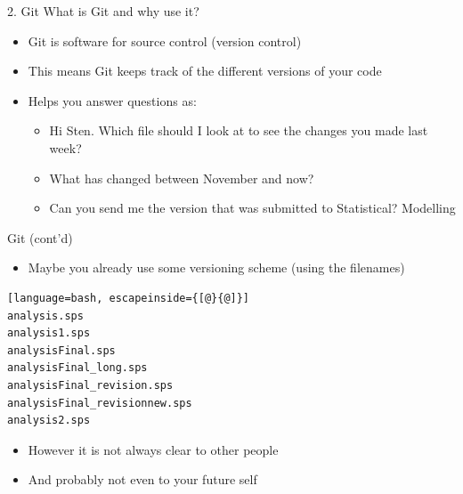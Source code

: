 \documentclass[14pt, aspectratio=169, sectionpage=simple, xclolor=table]{beamer}
\begin{document}
\begin{frame}{2. Git}
What is Git and why use it?
\begin{itemize}
	\item Git is software for \alert{source control} (version control)
	\item This means Git keeps track of the different versions of your code
	\item Helps you answer questions as:
	\begin{itemize}
		\item Hi Sten. Which file should I look at to see the changes you made last week?
		\item What has changed between November and now?
		\item Can you send me the version that was submitted to Statistical? Modelling
	\end{itemize}
\end{itemize} 
\end{frame}


\begin{frame}[fragile]{Git (cont'd)}
\begin{itemize}
\item Maybe you already use some versioning scheme (using the filenames)
\end{itemize}
\begin{lstlisting}[language=bash, escapeinside={[@}{@]}]
analysis.sps
analysis1.sps
analysisFinal.sps
analysisFinal_long.sps
analysisFinal_revision.sps
analysisFinal_revisionnew.sps
analysis2.sps
\end{lstlisting}
\begin{itemize}
\item 	However it is not always clear to other people
\item 	And probably not even to your future self
\end{itemize}
\end{frame}
\end{document}
